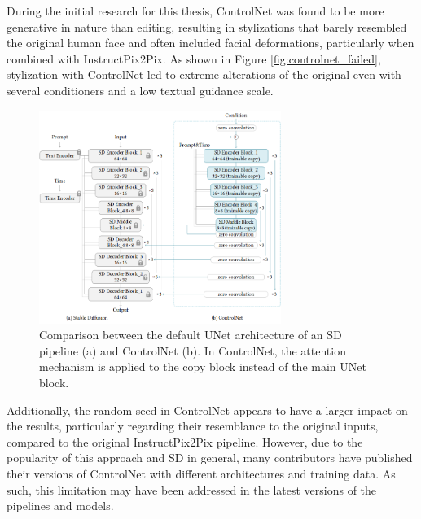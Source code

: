 During the initial research for this thesis, ControlNet was found to be more generative in nature than editing, resulting in stylizations that barely resembled the original human face and often included facial deformations, particularly when combined with InstructPix2Pix. As shown in Figure \ref{fig:controlnet_failed}, stylization with ControlNet led to extreme alterations of the original even with several conditioners and a low textual guidance scale.

\begin{figure}[ht]
    \centering
    \includegraphics[width=0.7\textwidth]{Figures/prelim_related/controlnet.png}
    \caption{Comparison between the default UNet architecture of an SD pipeline (a) and ControlNet \citep{Zhang.2023} (b). In ControlNet, the attention mechanism is applied to the copy block instead of the main UNet block.}
    \label{fig:controlnet}
\end{figure}

Additionally, the random seed in ControlNet appears to have a larger impact on the results, particularly regarding their resemblance to the original inputs, compared to the original InstructPix2Pix pipeline. However, due to the popularity of this approach and SD in general, many contributors have published their versions of ControlNet with different architectures and training data. As such, this limitation may have been addressed in the latest versions of the pipelines and models.

